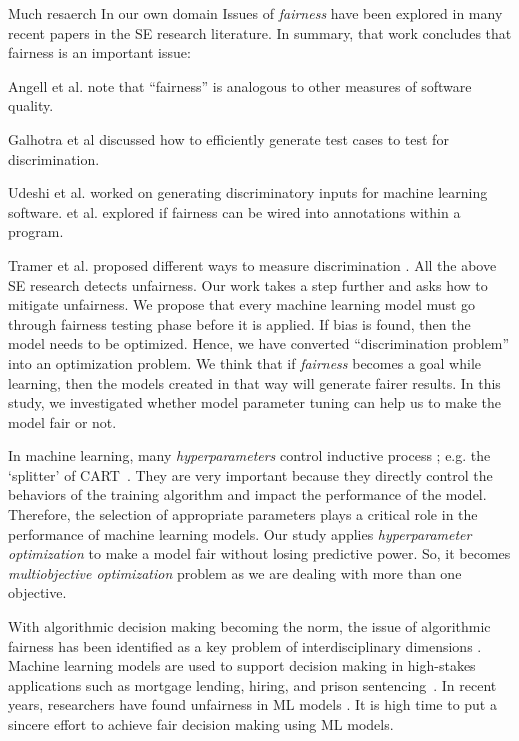 Much resaerch In our own domain Issues of \textit{fairness} have been explored in many  recent papers in the SE research literature.
In summary, that work concludes that fairness is an important issue:
\bi
\item Angell et al. \cite{Angell:2018:TAT:3236024.3264590}  note that     ``fairness'' is analogous to other measures of software quality. \item Galhotra et al discussed how to efficiently generate test cases to test for discrimination\cite{Galhotra_2017}. \item Udeshi et al. \cite{Udeshi_2018} worked on generating discriminatory  inputs for machine learning software. \itemAlbarghouthi et al. \cite{Albarghouthi:2019:FP:3287560.3287588} explored if fairness can be wired into annotations within a program.
\item Tramer et al. proposed different ways to measure discrimination \cite{Tramer_2017}.
\ei
All the above SE research detects unfairness. Our work takes a step further and asks how to mitigate
unfairness. We propose that every machine learning model must go through fairness testing phase before it is applied. If bias is found, then the model needs to be optimized. Hence, we have converted ``discrimination problem'' into an optimization problem. We think that if \textit{fairness} becomes a goal while learning, then the  models created in that way will generate fairer results. In this study, we investigated whether model parameter tuning can help us to make the model fair or not. 
 
 In machine learning, many  {\em hyperparameters} control   inductive process ; e.g. the   `splitter' of CART~\cite{breiman2017classification}.  They are very important because they directly control the behaviors of the training algorithm and impact the performance of the model. Therefore, the selection of appropriate parameters plays a critical role in the performance of machine learning models. Our study applies \textit{hyperparameter optimization} to make a model fair without losing predictive power. So, it becomes \textit{multiobjective optimization} problem as we are dealing with more than one objective. 
 

 
With algorithmic decision making becoming the norm, the issue of algorithmic fairness has been identified as a key problem of interdisciplinary dimensions \cite{IBM} . Machine learning models are used to support decision making in high-stakes applications such as mortgage lending, hiring, and prison sentencing~\cite{ladd1998evidence,burrell2016machine,corbett2018measure,galindo2000credit,yan2013system,chalfin2016productivity,ajit2016prediction,berk2015machine,berk2016forecasting,ozkan2017predicting}. In recent years, researchers have found unfairness in ML models \cite{IBM}. It is high time to put a sincere effort to achieve fair decision making using ML models.

